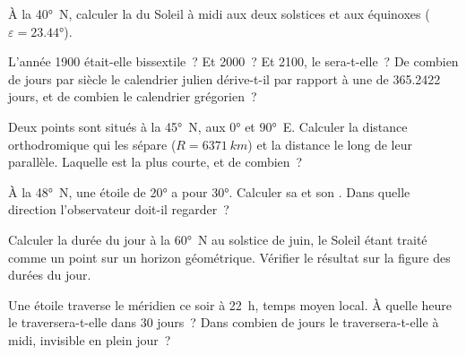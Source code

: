 \begin{exercise}[$\star$]\label{exo:b1:spherical-astronomy:3}
À la  \ang{40}~N, calculer la  du Soleil à midi aux deux
solstices et aux équinoxes ($\varepsilon = \ang{23.44}$).
\end{exercise}

\begin{exercise}[$\star$]\label{exo:b1:spherical-astronomy:4}
L'année 1900 était-elle bissextile~? Et 2000~? Et 2100, le sera-t-elle~? De
combien de jours par siècle le calendrier julien dérive-t-il par rapport à une
 de 365.2422 jours, et de combien le calendrier grégorien~?
\end{exercise}

\begin{exercise}[$\star\star$]\label{exo:b1:spherical-astronomy:5}
Deux points sont situés à la  \ang{45}~N, aux  \ang{0} et
\ang{90}~E. Calculer la distance orthodromique qui les sépare
($R = \qty{6371}{km}$) et la distance le long de leur parallèle. Laquelle est
la plus courte, et de combien~?
\end{exercise}

\begin{exercise}[$\star\star$]\label{exo:b1:spherical-astronomy:6}
À la  \ang{48}~N, une étoile de  \ang{20} a pour  \ang{30}. Calculer sa  et son . Dans quelle direction
l'observateur doit-il regarder~?
\end{exercise}

\begin{exercise}[$\star\star$]\label{exo:b1:spherical-astronomy:7}
Calculer la durée du jour à la  \ang{60}~N au solstice de juin, le
Soleil étant traité comme un point sur un horizon géométrique. Vérifier le
résultat sur la figure des durées du jour.
\end{exercise}

\begin{exercise}[$\star\star$]\label{exo:b1:spherical-astronomy:8}
Une étoile traverse le méridien ce soir à 22~h, temps moyen local. À quelle
heure le traversera-t-elle dans 30 jours~? Dans combien de jours le
traversera-t-elle à midi, invisible en plein jour~?
\end{exercise}

